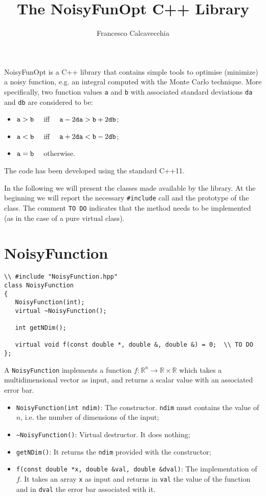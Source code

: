 \documentclass[11pt,a4paper,twoside]{article}
\title{The NoisyFunOpt C++ Library}
\author{Francesco Calcavecchia}
\begin{document}
\maketitle

NoisyFunOpt is a C++ library that contains simple tools to optimise (minimize) a noisy function, e.g. an integral computed with the Monte Carlo technique.
More specifically, two function values \verb+a+ and \verb+b+ with associated standard deviations \verb+da+ and \verb+db+ are considered to be:
\begin{itemize}
   \item $\verb+a+ > \verb+b+ \quad $ iff $ \quad \verb+a+ - 2 \verb+da+ > \verb+b+ + 2 \verb+db+$;
   \item $\verb+a+ < \verb+b+ \quad $ iff $ \quad \verb+a+ + 2 \verb+da+ < \verb+b+ - 2 \verb+db+$;
   \item $\verb+a+ = \verb+b+ \quad $ otherwise.
\end{itemize}

The code has been developed using the standard C++11.

In the following we will present the classes made available by the library.
At the beginning we will report the necessary \verb+#include+ call and the prototype of the class.
The comment \verb+TO DO+ indicates that the method needs to be implemented (as in the case of a pure virtual class).


\section{NoisyFunction}
\label{sec:NoisyFunction}

\begin{lstlisting}
\\ #include "NoisyFunction.hpp"
class NoisyFunction
{
   NoisyFunction(int);
   virtual ~NoisyFunction();
   
   int getNDim();
   
   virtual void f(const double *, double &, double &) = 0;  \\ TO DO
};
\end{lstlisting}

A \verb+NoisyFunction+ implements a function $f:\mathbb{R}^{n} \rightarrow \mathbb{R} \times \mathbb{R}$ which takes a multidimensional vector as input, and returns a scalar value with an associated error bar. 

\begin{itemize}
   \item \verb+NoisyFunction(int ndim)+: The constructor. \verb+ndim+ must contains the value of $n$, i.e. the number of dimensions of the input;
   \item \verb+~NoisyFunction()+: Virtual destructor. It does nothing;
   \item \verb+getNDim()+: It returns the \verb+ndim+ provided with the constructor;
   \item \verb+f(const double *x, double &val, double &dval)+: The implementation of $f$. It takes an array \verb+x+ as input and returns in \verb+val+ the value of the function and in \verb+dval+ the error bar associated with it.
\end{itemize}
\end{document}
